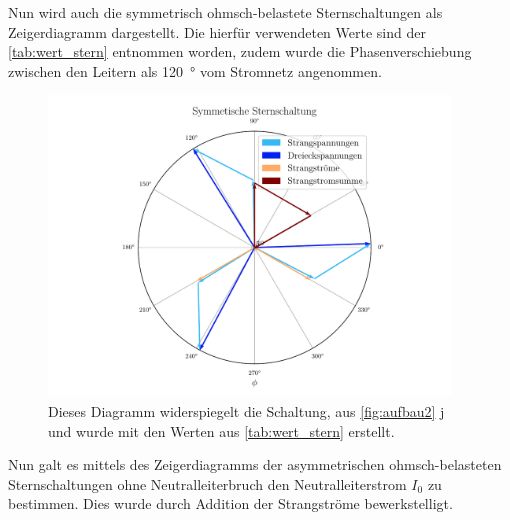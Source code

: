 \documentclass[12pt,english,ngerman]{scrartcl}
\begin{document}
Nun wird auch die symmetrisch ohmsch-belastete Sternschaltungen als
Zeigerdiagramm dargestellt. Die hierfür verwendeten Werte sind der
\autoref{tab:wert_stern} entnommen worden, zudem wurde die Phasenverschiebung
zwischen den Leitern als \SI{120}{\degree} vom Stromnetz angenommen.

\begin{figure}[H]
	\begin{center}
		\includegraphics[width = 0.95\textwidth]{figures/zeigerSternSym.pdf}
	\end{center}
	\caption[Zeigerdiagramm einer symmetrisch ohmsch-belastete Sternschaltung]{Dieses
		Diagramm widerspiegelt die Schaltung, aus \autoref{fig:aufbau2} j und wurde mit
		den Werten aus \autoref{tab:wert_stern} erstellt.
	}\label{fig:zeigerSternSym}
\end{figure}

Nun galt es mittels des Zeigerdiagramms der asymmetrischen ohmsch-belasteten
Sternschaltungen ohne Neutralleiterbruch den Neutralleiterstrom $I_0$ zu
bestimmen. Dies wurde durch Addition der Strangströme bewerkstelligt.
\end{document}
